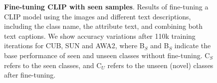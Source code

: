 \begin{figure}[hbt!]
\centering
{}
\caption{\textbf{Fine-tuning CLIP with seen samples}. Results of fine-tuning a CLIP model using the images and different text descriptions, including the class name, the attribute text, and combining both text captions. We show accuracy variations after 110k training iterations for CUB\cite{CUB}, SUN\cite{SUN} and AWA2\cite{AWA2}, where B$_S$ and B$_S$ indicate the base performance of seen and unseen classes without fine-tuning. C$_S$ refers to the seen classes, and C$_U$ refers to the unseen (novel) classes after fine-tuning.} 
\label{fig:finetuned_clip_accs}
\vspace{-0.1in}
\end{figure}



